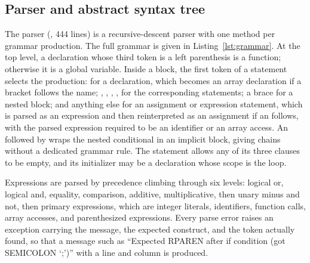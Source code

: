 \subsection{Parser and abstract syntax tree}

The parser (, 444 lines) is a recursive-descent parser with one method per grammar production. The full grammar is given in Listing~\ref{lst:grammar}. At the top level, a declaration whose third token is a left parenthesis is a function; otherwise it is a global variable. Inside a block, the first token of a statement selects the production:  for a declaration, which becomes an array declaration if a bracket follows the name; , , , ,  for the corresponding statements; a brace for a nested block; and anything else for an assignment or expression statement, which is parsed as an expression and then reinterpreted as an assignment if an \code{=} follows, with the parsed expression required to be an identifier or an array access. An  followed by  wraps the nested conditional in an implicit block, giving  chains without a dedicated grammar rule. The  statement allows any of its three clauses to be empty, and its initializer may be a declaration whose scope is the loop.

Expressions are parsed by precedence climbing through six levels: logical or, logical and, equality, comparison, additive, multiplicative, then unary minus and not, then primary expressions, which are integer literals, identifiers, function calls, array accesses, and parenthesized expressions. Every parse error raises an exception carrying the message, the expected construct, and the token actually found, so that a message such as ``Expected RPAREN after if condition (got SEMICOLON `;')'' with a line and column is produced.

